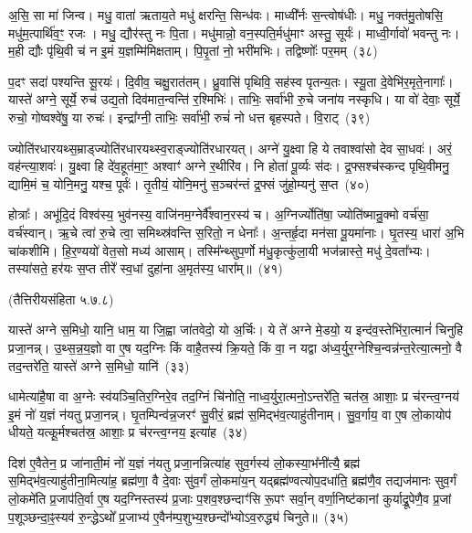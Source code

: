 अ॒सि॒ सा मा॑ जिन्व। मधु॒ वाता॑ ऋताय॒ते मधु॑ क्षरन्ति॒ सिन्ध॑वः। माध्वी᳚र्नः स॒न्त्वोष॑धीः। मधु॒ नक्त॑मु॒तोषसि॒ मधु॑म॒त्पार्थि॑व॒ꣳ॒ रजः। मधु॒ द्यौर॑स्तु नः पि॒ता। मधु॑मान्नो॒ वन॒स्पति॒र्मधु॑माꣳ अस्तु॒ सूर्यः॑। माध्वी॒र्गावो॑ भवन्तु नः। म॒ही द्यौः पृ॑थि॒वी च॑ न इ॒मं य॒ज्ञम्मि॑मिक्षताम्। पि॒पृ॒तां नो॒ भरी॑मभिः। तद्विष्णोः᳚ पर॒मम्~(३८)

प॒दꣳ सदा॑ पश्यन्ति सू॒रयः॑। दि॒वीव॒ चक्षु॒रात॑तम्। ध्रु॒वासि॑ पृथिवि॒ सह॑स्व पृतन्य॒तः। स्यू॒ता दे॒वेभि॑र॒मृते॒नागाः᳚। यास्ते॑ अग्ने॒ सूर्ये॒ रुच॑ उद्य॒तो दिव॑मात॒न्वन्ति॑ र॒श्मिभिः॑। ताभिः॒ सर्वा॑भी रु॒चे जना॑य नस्कृधि। या वो॑ देवाः॒ सूर्ये॒ रुचो॒ गोष्वश्वे॑षु॒ या रुचः॑। इन्द्रा᳚ग्नी॒ ताभिः॒ सर्वा॑भी॒ रुचं॑ नो धत्त बृहस्पते। वि॒राट्~(३९)

ज्योति॑रधारयथ्स॒म्राड्ज्योति॑रधारयथ्स्व॒राड्ज्योति॑रधारयत्। अग्ने॑ यु॒क्ष्वा हि ये तवाश्वा॑सो देव सा॒धवः॑। अरं॒ वह॑न्त्या॒शवः॑। यु॒क्ष्वा हि दे॑व॒हूत॑मा॒ꣳ॒ अश्वाꣳ॑ अग्ने र॒थीरि॑व। नि होता॑ पू॒र्व्यः स॑दः। द्र॒फ्सश्च॑स्कन्द पृथि॒वीमनु॒ द्यामि॒मं च॒ योनि॒मनु॒ यश्च॒ पूर्वः॑। तृ॒तीयं॒ योनि॒मनु॑ स॒ञ्चर॑न्तं द्र॒फ्सं जु॑हो॒म्यनु॑ स॒प्त~(४०)

होत्राः᳚। अभू॑दि॒दं विश्व॑स्य॒ भुव॑नस्य॒ वाजि॑नम॒ग्नेर्वै᳚श्वान॒रस्य॑ च। अ॒ग्निर्ज्योति॑षा॒ ज्योति॑ष्मान्रु॒क्मो वर्च॑सा॒ वर्च॑स्वान्। ऋ॒चे त्वा॑ रु॒चे त्वा॒ समिथ्स्र॑वन्ति स॒रितो॒ न धेनाः᳚। अ॒न्तर्\mbox{}हृ॒दा मन॑सा पू॒यमा॑नाः। घृ॒तस्य॒ धारा॑ अ॒भि चा॑कशीमि। हि॒र॒ण्ययो॑ वेत॒सो मध्य॑ आसाम्। तस्मि᳚न्थ्सुप॒र्णो म॑धु॒कृत्कु॑ला॒यी भज॑न्नास्ते॒ मधु॑ दे॒वता᳚भ्यः। तस्या॑सते॒ हर॑यः स॒प्त तीरे᳚ स्व॒धां दुहा॑ना अ॒मृत॑स्य॒ धारा᳚म्॥~(४१)

\centerline{\scriptsize (तैत्तिरीयसंहिता ५.७.८)}

यास्ते॑ अग्ने स॒मिधो॒ यानि॒ धाम॒ या जि॒ह्वा जा॑तवेदो॒ यो अ॒र्चिः। ये ते॑ अग्ने मे॒डयो॒ य इन्द॑व॒स्तेभि॑रा॒त्मानं॑ चिनुहि प्रजा॒नन्न्। उ॒थ्स॒न्न॒य॒ज्ञो वा ए॒ष यद॒ग्निः किं वाहै॒तस्य॑ क्रि॒यते॒ किं वा॒ न यद्वा अ॑ध्व॒र्युर॒ग्नेश्चि॒न्वन्न॑न्त॒रेत्या॒त्मनो॒ वै तद॒न्तरे॑ति॒ यास्ते॑ अग्ने स॒मिधो॒ यानि॑~(३३)

धामेत्या॑है॒षा वा अ॒ग्नेः स्व॑यञ्चि॒तिर॒ग्निरे॒व तद॒ग्निं चि॑नोति॒ नाध्व॒र्युरा॒त्मनो॒\-ऽन्तरे॑ति॒ चत॑स्र॒ आशाः॒ प्र च॑रन्त्व॒ग्नय॑ इ॒मं नो॑ य॒ज्ञं न॑यतु प्रजा॒नन्न्। घृ॒तम्पिन्व॑न्न॒जरꣳ॑ सु॒वीरं॒ ब्रह्म॑ स॒मिद्भ॑व॒त्याहु॑तीनाम्। सु॒व॒र्गाय॒ वा ए॒ष लो॒कायोप॑ धीयते॒ यत्कू॒र्मश्चत॑स्र॒ आशाः॒ प्र च॑रन्त्व॒ग्नय॒ इत्या॑ह~(३४)

दिश॑ ए॒वैतेन॒ प्र जा॑नाती॒मं नो॑ य॒ज्ञं न॑यतु प्रजा॒नन्नित्या॑ह सुव॒र्गस्य॑ लो॒कस्या॒भ᳚नी॑त्यै॒ ब्रह्म॑ स॒मिद्भ॑व॒त्याहु॑तीना॒मित्या॑ह॒ ब्रह्म॑णा॒ वै दे॒वाः सु॑व॒र्गं लो॒कमा॑य॒न् यद्ब्रह्म॑ण्वत्योप॒दधा॑ति॒ ब्रह्म॑णै॒व तद्यज॑मानः सुव॒र्गं लो॒कमे॑ति प्र॒जा\-प॑ति॒र्वा ए॒ष यद॒ग्निस्तस्य॑ प्र॒जाः प॒शव॒श्छन्दाꣳ॑सि रू॒पꣳ सर्वा॒न् वर्णा॒निष्ट॑कानां कुर्याद्रू॒पेणै॒व प्र॒जां प॒शूञ्छन्दा॒ꣴ॒स्यव॑ रु॒न्द्धे\-ऽथो᳚ प्र॒जाभ्य॑ ए॒वैन॑म्प॒शुभ्य॒श्छन्दो᳚भ्यो\-ऽव॒रुद्ध्य॑ चिनुते॥~(३५)


